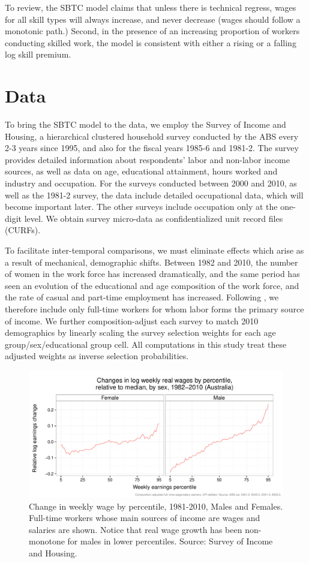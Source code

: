 To review, the SBTC model claims that unless there is technical regress, wages for all skill types will always increase, and never decrease (wages should follow a monotonic path.) Second, in the presence of an increasing proportion of workers conducting skilled work, the model is consistent with either a rising or a falling log skill premium.

\section{Data}

To bring the SBTC model to the data, we employ the Survey of Income and Housing, a hierarchical clustered household survey conducted by the ABS every 2-3 years since 1995, and also for the fiscal years 1985-6 and 1981-2. The survey provides detailed  information about respondents' labor and non-labor income sources, as well as data on age, educational attainment, hours worked and industry and occupation. For the surveys conducted between 2000 and 2010, as well as the 1981-2 survey, the data include detailed occupational data, which will become important later. The other surveys include occupation only at the one-digit level. We obtain survey micro-data as confidentialized unit record files (CURFs).

To facilitate inter-temporal comparisons, we must eliminate effects which arise as a result of mechanical, demographic shifts. Between 1982 and 2010, the number of women in the work force has increased dramatically, and the same period has seen an evolution of the educational and age composition of the work force, and the rate of casual and part-time employment has increased. Following \citet{Acemoglu2011}, we therefore include only full-time workers for whom labor forms the primary source of income. We further composition-adjust each survey to match 2010 demographics by linearly scaling the survey selection weights for each age group/sex/educational group cell. All computations in this study treat these adjusted weights as inverse selection probabilities.

\begin{figure}
  \centering
  \includegraphics[width=\textwidth]{../figure/quantile_mf.pdf}
  \caption{Change in weekly wage by percentile, 1981-2010, Males and Females. Full-time workers whose main sources of income are wages and salaries are shown. Notice that real wage growth has been non-monotone for males in lower percentiles. Source: Survey of Income and Housing.}
  \label{fig:banana}
\end{figure}

